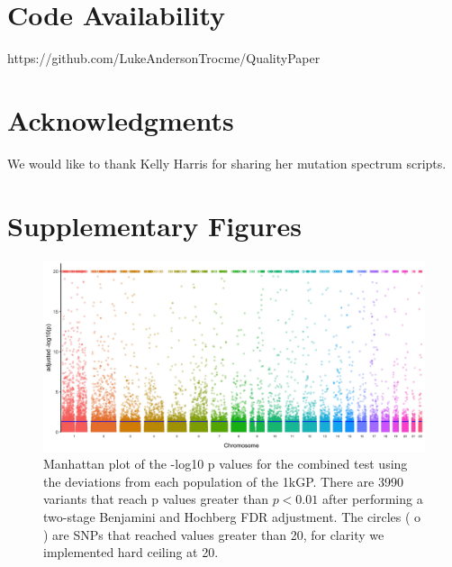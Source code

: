\documentclass[9pt,lineno]{elife}
\begin{document}
\section{Code Availability}
https://github.com/LukeAndersonTrocme/QualityPaper

\section{Acknowledgments}
We would like to thank Kelly Harris for sharing her mutation spectrum scripts.



\section{Supplementary Figures}
\renewcommand{\thefigure}{S\arabic{figure}}
\setcounter{figure}{0}   	

\begin{figure}
\includegraphics[width=\hsize,keepaspectratio]{./Figures/ManhattanPlot_adjusted.jpg}

\caption{Manhattan plot of the -log10 p values for the combined test using the deviations from each population of the 1kGP. 
There are 3990 variants that reach p values greater than $ p < 0.01$ after performing a two-stage Benjamini and Hochberg FDR adjustment. 
The circles ( o ) are SNPs that reached values greater than 20, for clarity we implemented hard ceiling at 20.}
  \label{Manhattan}
\end{figure}
\end{document}
